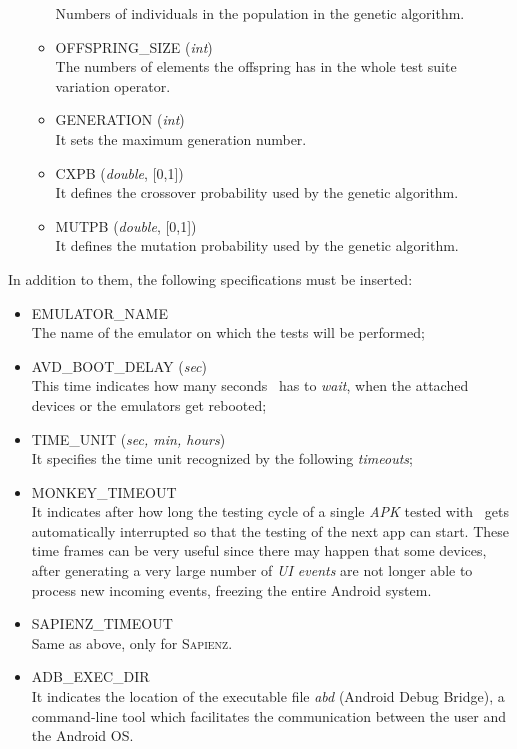 \begin{itemize}
\begin{itemize}
Numbers of individuals in the population in the genetic algorithm. 
\item OFFSPRING\_SIZE (\textit{int})\\
The numbers of elements the offspring has in the whole test suite variation operator. 
\item GENERATION (\textit{int})\\
It sets the maximum generation number. 
\item CXPB (\textit{double}, [0,1])\\
It defines the crossover probability used by the genetic algorithm. 
\item MUTPB (\textit{double}, [0,1])\\
It defines the mutation probability used by the genetic algorithm. 
\end{itemize}
\end{itemize}

In addition to them, the following specifications must be inserted: 
\begin{itemize}
\item \textsc{EMULATOR\_NAME} \\
The name of the emulator on which the tests will be performed;
\item \textsc{AVD\_BOOT\_DELAY} (\textit{sec})\\
This time indicates how many seconds \toolname\ has to \textit{wait}, when the attached devices or the emulators get rebooted;
\item \textsc{TIME\_UNIT} (\textit{sec, min, hours})\\
It specifies the time unit recognized by the following \textit{timeouts}; 
\item \textsc{MONKEY\_TIMEOUT} \\
It indicates after how long the testing cycle of a single \textit{APK} tested with \monkey\ gets automatically interrupted so that the testing of the next app can start. These time frames can be very useful since there may happen that some devices, after generating a very large number of \textit{UI events} are not longer able to process new incoming events, freezing the entire Android system. 
\item \textsc{SAPIENZ\_TIMEOUT} \\
Same as above, only for \textsc{Sapienz}.
\item \textsc{ADB\_EXEC\_DIR}\\
It indicates the location of the executable file \textit{abd} (Android Debug Bridge), a command-line tool which facilitates the communication between the user and the Android OS. 
\end{itemize}


